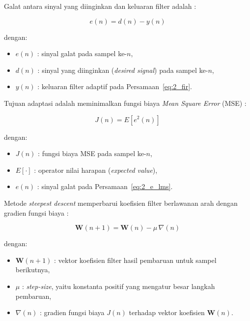 Galat antara sinyal yang diinginkan dan keluaran filter adalah \parencite{zhangrs2023}:

\begin{equation}
  \label{eq:2_e_lms}
  e(n) = d(n) - y(n)
\end{equation}

dengan:
\begin{itemize}[noitemsep, topsep=2pt]
  \item $e(n)$ : sinyal galat pada sampel ke-$n$,
  \item $d(n)$ : sinyal yang diinginkan (\emph{desired signal}) pada sampel ke-$n$,
  \item $y(n)$ : keluaran filter adaptif pada Persamaan~\eqref{eq:2_fir}.
\end{itemize}

Tujuan adaptasi adalah meminimalkan fungsi biaya \emph{Mean Square Error} (MSE) \parencite{zhangrs2023}:

\begin{equation}
  \label{eq:2_mse}
  J(n) = E\left[e^2(n)\right]
\end{equation}

dengan:
\begin{itemize}[noitemsep, topsep=2pt]
  \item $J(n)$ : fungsi biaya MSE pada sampel ke-$n$,
  \item $E[\cdot]$ : operator nilai harapan (\emph{expected value}),
  \item $e(n)$ : sinyal galat pada Persamaan~\eqref{eq:2_e_lms}.
\end{itemize}

Metode \emph{steepest descent} memperbarui koefisien filter berlawanan arah dengan gradien fungsi biaya \parencite{zhangrs2023}:

\begin{equation}
  \label{eq:2_sd}
  \mathbf{W}(n+1) = \mathbf{W}(n) - \mu\,\nabla(n)
\end{equation}

dengan:
\begin{itemize}[noitemsep, topsep=2pt]
  \item $\mathbf{W}(n+1)$ : vektor koefisien filter hasil pembaruan untuk sampel berikutnya,
  \item $\mu$ : \emph{step-size}, yaitu konstanta positif yang mengatur besar langkah pembaruan,
  \item $\nabla(n)$ : gradien fungsi biaya $J(n)$ terhadap vektor koefisien $\mathbf{W}(n)$.
\end{itemize}

